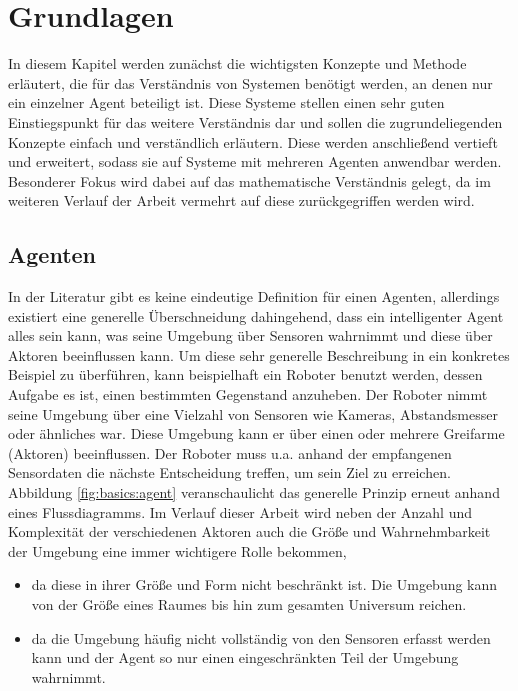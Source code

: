 \chapter{Grundlagen}
In diesem Kapitel werden zunächst die wichtigsten Konzepte und Methode erläutert, die für das Verständnis von Systemen benötigt werden, an denen nur ein einzelner Agent beteiligt ist. Diese Systeme stellen einen sehr guten Einstiegspunkt für das weitere Verständnis dar und sollen die zugrundeliegenden Konzepte einfach und verständlich erläutern.
Diese werden anschließend vertieft und erweitert, sodass sie auf Systeme mit mehreren Agenten anwendbar werden. \\
Besonderer Fokus wird dabei auf das mathematische Verständnis gelegt, da im weiteren Verlauf der Arbeit vermehrt auf diese zurückgegriffen werden wird.

\section{Agenten}

	In der Literatur gibt es keine eindeutige Definition für einen Agenten, allerdings existiert eine generelle Überschneidung dahingehend, dass ein intelligenter Agent alles sein kann, was seine Umgebung über Sensoren wahrnimmt und diese über Aktoren beeinflussen kann.
	Um diese sehr generelle Beschreibung in ein konkretes Beispiel zu überführen, kann beispielhaft ein Roboter benutzt werden, dessen Aufgabe es ist, einen bestimmten Gegenstand anzuheben. Der Roboter nimmt seine Umgebung über eine Vielzahl von Sensoren wie \zB Kameras, Abstandsmesser oder ähnliches war. Diese Umgebung kann er \zB über einen oder mehrere Greifarme (Aktoren) beeinflussen. Der Roboter muss u.a. anhand der empfangenen Sensordaten die nächste Entscheidung treffen, um sein Ziel zu erreichen.
	Abbildung \ref{fig:basics:agent} veranschaulicht das generelle Prinzip erneut anhand eines Flussdiagramms.
	Im Verlauf dieser Arbeit wird neben der Anzahl und Komplexität der verschiedenen Aktoren auch die Größe und Wahrnehmbarkeit der Umgebung eine immer wichtigere Rolle bekommen,

	\begin{itemize}
		\item da diese in ihrer Größe und Form nicht beschränkt ist. Die Umgebung kann \zB von der Größe eines Raumes bis hin zum gesamten Universum reichen.
		\item da die Umgebung häufig nicht vollständig von den Sensoren erfasst werden kann und der Agent so nur einen eingeschränkten Teil der Umgebung wahrnimmt.
	\end{itemize}


